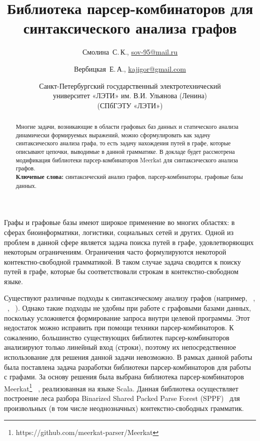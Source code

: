 \documentclass [a4paper] {article}
\title %
  {Библиотека парсер-комбинаторов для синтаксического анализа графов}
\author %
{%
  Смолина~С.\,К., \url {sov-95@mail.ru} \and %
  Вербицкая~Е.\,А., \url {kajigor@gmail.com} \and %
  Санкт-Петербургский государственный электротехнический
  \\университет «ЛЭТИ» им. В.И. Ульянова (Ленина)
  \\(СПбГЭТУ «ЛЭТИ») \\
}%
\date {}    %
\begin{document}

\maketitle

\begin {abstract}
  Многие задачи, возникающие в области графовых баз данных и статического анализа динамически формируемых выражений, можно сформулировать как задачу синтаксического анализа графа, то есть задачу нахождения путей в графе, которые описывают цепочки, выводимые в данной грамматике. В докладе будет рассмотрена модификация библиотеки парсер-комбинаторов Meerkat для синтаксического анализа графов. 
  \\ \textbf {Ключевые слова:} синтаксический анализ графов, парсер-комбинаторы, графовые базы данных.
\end {abstract}

Графы и графовые базы имеют широкое применение во многих областях: в сферах биоинформатики, логистики, социальных сетей и других. Одной из проблем в данной сфере является задача поиска путей в графе, удовлетворяющих некоторым ограничениям. Ограничения часто формулируются некоторой контекстно-свободной грамматикой. В таком случае задача сводится к поиску путей в графе, которые бы соответствовали строкам в контекстно-свободном языке.


Существуют различные подходы к синтаксическому анализу графов (например, ~\cite{smolina-spbgetu-hellings}, ~\cite{smolina-spbgetu-graph-parsing}, ~\cite{smolina-spbgetu-sevon}). Однако такие подходы не удобны при работе с графовыми базами данных, поскольку усложняется формирование запроса внутри целевой программы. Этот недостаток можно исправить при помощи техники парсер-комбинаторов. К сожалению, большинство существующих библиотек парсер-комбинаторов анализируют только линейный вход (строки), поэтому их непосредственное использование для решения данной задачи невозможно. В рамках данной работы была поставлена задача разработки библиотеки парсер-комбинаторов для работы с графами.
За основу решения была выбрана библиотека парсер-комбинаторов Meerkat\footnote{https://github.com/meerkat-parser/Meerkat} ~\cite{smolina-spbgetu-meerkat}, реализованная на языке Scala. Данная библиотека осуществляет построение леса разбора Binarized Shared Packed Parse Forest (SPPF)~\cite{smolina-spbgetu-sppf} для произвольных (в том числе неоднозначных) контекстно-свободных грамматик.
\end{document}
